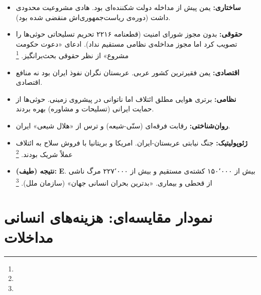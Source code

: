 \begin{tcolorbox}[casebox, title={تحلیل شش‌وجهی: یمن (۲۰۱۵)}]
\begin{itemize}[nosep, rightmargin=1em]
  \item \textbf{ساختاری:} یمن پیش از مداخله دولت شکننده‌ای بود. هادی مشروعیت محدودی داشت (دوره‌ی ریاست‌جمهوری‌اش منقضی شده بود).
  \item \textbf{حقوقی:} بدون مجوز شورای امنیت (قطعنامه ۲۲۱۶ تحریم تسلیحاتی حوثی‌ها را تصویب کرد اما مجوز مداخله‌ی نظامی مستقیم نداد). ادعای «دعوت حکومت مشروع» از نظر حقوقی بحث‌برانگیز.%
  \footnote{}
  \item \textbf{اقتصادی:} یمن فقیرترین کشور عربی. عربستان نگران نفوذ ایران بود نه منافع اقتصادی.
  \item \textbf{نظامی:} برتری هوایی مطلق ائتلاف اما ناتوانی در پیشروی زمینی. حوثی‌ها از حمایت ایرانی (تسلیحات و مشاوره) بهره بردند.
  \item \textbf{روان‌شناختی:} رقابت فرقه‌ای (سنّی-شیعه) و ترس از «هلال شیعی» ایران.
  \item \textbf{ژئوپولیتیک:} جنگ نیابتی عربستان-ایران. امریکا و بریتانیا با فروش سلاح به ائتلاف عملاً شریک بودند.%
  \footnote{}
  \item \textbf{نتیجه (طیف):} \textbf{E}. بیش از ۱۵۰٬۰۰۰ کشته‌ی مستقیم و بیش از ۲۲۷٬۰۰۰ مرگ ناشی از قحطی و بیماری. «بدترین بحران انسانی جهان» (سازمان ملل).%
  \footnote{}
\end{itemize}
\end{tcolorbox}

\section{نمودار مقایسه‌ای: هزینه‌های انسانی مداخلات}
\label{sec:ch10-human-cost}

